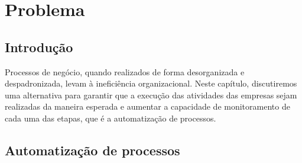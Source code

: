 \chapter{Problema}\label{chp:LABEL_CHP_3}

\section{Introdução}\label{sec:LABEL_CHP_3_SEC_A}
Processos de negócio, quando realizados de forma desorganizada e despadronizada, levam à ineficiência organizacional. Neste capítulo, discutiremos uma alternativa para garantir que a execução das atividades das empresas sejam realizadas da maneira esperada e aumentar a capacidade de monitoramento de cada uma das etapas, que é a automatização de processos. 

\section{Automatização de processos}\label{sec:LABEL_CHP_3_SEC_B}



